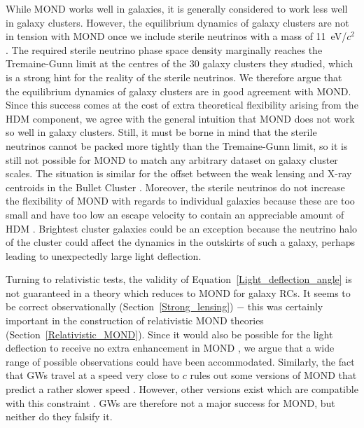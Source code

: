 \documentclass[fleqn,usenatbib,useAMS,onecolumn]{mnras} %
\begin{document}
While MOND works well in galaxies, it is generally considered to work less well in galaxy clusters. However, the equilibrium dynamics of galaxy clusters are not in tension with MOND once we include sterile neutrinos with a mass of 11~eV/$c^2$ \citep{Angus_2010}. The required sterile neutrino phase space density marginally reaches the Tremaine-Gunn limit at the centres of the 30 galaxy clusters they studied, which is a strong hint for the reality of the sterile neutrinos. We therefore argue that the equilibrium dynamics of galaxy clusters are in good agreement with MOND. Since this success comes at the cost of extra theoretical flexibility arising from the HDM component, we agree with the general intuition that MOND does not work so well in galaxy clusters. Still, it must be borne in mind that the sterile neutrinos cannot be packed more tightly than the Tremaine-Gunn limit, so it is still not possible for MOND to match any arbitrary dataset on galaxy cluster scales. The situation is similar for the offset between the weak lensing and X-ray centroids in the Bullet Cluster \citep[which is consistent with MOND even with a lower sterile neutrino mass of only 2~eV/$c^2$;][]{Angus_2007}. Moreover, the sterile neutrinos do not increase the flexibility of MOND with regards to individual galaxies because these are too small and have too low an escape velocity to contain an appreciable amount of HDM \citep{Angus_2010_minimum_neutrino_mass}. Brightest cluster galaxies could be an exception because the neutrino halo of the cluster could affect the dynamics in the outskirts of such a galaxy, perhaps leading to unexpectedly large light deflection.

Turning to relativistic tests, the validity of Equation~\ref{Light_deflection_angle} is not guaranteed in a theory which reduces to MOND for galaxy RCs. It seems to be correct observationally (Section~\ref{Strong_lensing}) $-$ this was certainly important in the construction of relativistic MOND theories (Section~\ref{Relativistic_MOND}). Since it would also be possible for the light deflection to receive no extra enhancement in MOND \citep{Sanders_1997}, we argue that a wide range of possible observations could have been accommodated. Similarly, the fact that GWs travel at a speed very close to $c$ \citep{LIGO_Virgo_2017} rules out some versions of MOND that predict a rather slower speed \citep{Boran_2018}. However, other versions exist which are compatible with this constraint \citep{Sanders_2018, Skordis_2019}. GWs are therefore not a major success for MOND, but neither do they falsify it.
\end{document}
